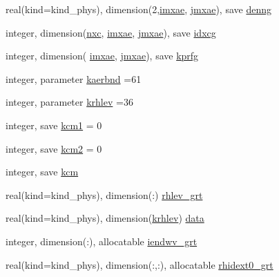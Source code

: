 \begin{DoxyCompactItemize}
\item 
real(kind=kind\+\_\+phys), dimension(2,\hyperlink{group__module__radiation__aerosols_ga52cda855a397136f75768d205292ddbb}{imxae}, \hyperlink{group__module__radiation__aerosols_gafdfdd058364062349b02cec9c712ea80}{jmxae}), save \hyperlink{group__module__radiation__aerosols_ga0ccc698bc870cb6ccbc1c2b64a3f45f6}{denng}
\item 
integer, dimension(\hyperlink{group__module__radiation__aerosols_ga1fffbb55ad2986a216b721a6c103c4cf}{nxc}, \hyperlink{group__module__radiation__aerosols_ga52cda855a397136f75768d205292ddbb}{imxae}, \hyperlink{group__module__radiation__aerosols_gafdfdd058364062349b02cec9c712ea80}{jmxae}), save \hyperlink{group__module__radiation__aerosols_ga4cb38abaf6ece5a0ed717edd6f6b4078}{idxcg}
\item 
integer, dimension(     \hyperlink{group__module__radiation__aerosols_ga52cda855a397136f75768d205292ddbb}{imxae}, \hyperlink{group__module__radiation__aerosols_gafdfdd058364062349b02cec9c712ea80}{jmxae}), save \hyperlink{group__module__radiation__aerosols_ga28df10ba381278cc7474bea0bfdaa870}{kprfg}
\item 
integer, parameter \hyperlink{group__module__radiation__aerosols_gad345c77fc29d8b02de34990162645a66}{kaerbnd} =61
\item 
integer, parameter \hyperlink{group__module__radiation__aerosols_ga33f2d4489a1730a27cbdc2e2add0f977}{krhlev} =36
\item 
integer, save \hyperlink{group__module__radiation__aerosols_ga92b09dd26cc321af3b5da0b1c310a588}{kcm1} = 0
\item 
integer, save \hyperlink{group__module__radiation__aerosols_gab2be28697a95bcec8d5cd8de7ebd4328}{kcm2} = 0
\item 
integer, save \hyperlink{group__module__radiation__aerosols_ga4816bc93b826ff2fad9ff0805ea39fd5}{kcm}
\item 
real(kind=kind\+\_\+phys), dimension(\+:) \hyperlink{group__module__radiation__aerosols_gace40d50e36de1fc08c4ff35f6d8dbda9}{rhlev\+\_\+grt}
\item 
real(kind=kind\+\_\+phys), dimension(\hyperlink{group__module__radiation__aerosols_ga33f2d4489a1730a27cbdc2e2add0f977}{krhlev}) \hyperlink{group__module__radiation__aerosols_ga1248e740e53498ed7a06f7d475b1fb25}{data}
\item 
integer, dimension(\+:), allocatable \hyperlink{group__module__radiation__aerosols_gac755c4235327053fff060ffa3b2ee2a3}{iendwv\+\_\+grt}
\item 
real(kind=kind\+\_\+phys), dimension(\+:,\+:), allocatable \hyperlink{group__module__radiation__aerosols_ga6683021bded82850053c16eb3e906998}{rhidext0\+\_\+grt}

\end{DoxyCompactItemize}

